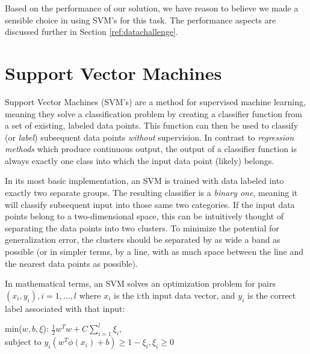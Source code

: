 \documentclass{netsec2012}
\begin{document}
Based on the performance of our solution, we have reason to believe we made a sensible choice in
using SVM's for this task.  The performance aspects are discussed further in Section
\ref{ref:datachallenge}.


\section{Support Vector Machines}

\label{ref:svmintro}

Support Vector Machines (SVM's) are a method for supervised machine learning, meaning they solve a
classification problem by creating a classifier function from a set of existing, labeled data
points.  This function can then be used to classify (or \emph{label}) subsequent data points
\emph{without} supervision.  In contrast to \emph{regression methods} which produce continuous
output, the output of a classifier function is always exactly one class into which the input data
point (likely) belongs.

In its most basic implementation, an SVM is trained with data labeled into exactly two separate
groups.  The resulting classifier is a \emph{binary one}, meaning it will classify subsequent input
into those same two categories.  If the input data points belong to a two-dimensional space, this
can be intuitively thought of separating the data points into two clusters.  To minimize the
potential for generalization error, the clusters should be separated by as wide a band as possible
(or in simpler terms, by a line, with as much space between the line and the nearest data points as
possible). \cite{svm_chemistry}

In mathematical terms, an SVM solves an optimization problem for pairs
$(x_i, y_i), i = 1, ..., l$ where $x_i$ is the i:th input data vector, and $y_i$ is the correct
label associated with that input:

\begin{center}
min($w,b,\xi$): $\frac{1}{2}w^Tw + C \sum_{i=1}^l\xi_i$, \\
subject to $y_i(w^T \phi(x_i) + b) \ge 1 - \xi_i, \xi_i \ge 0$
\end{center}
\end{document}
